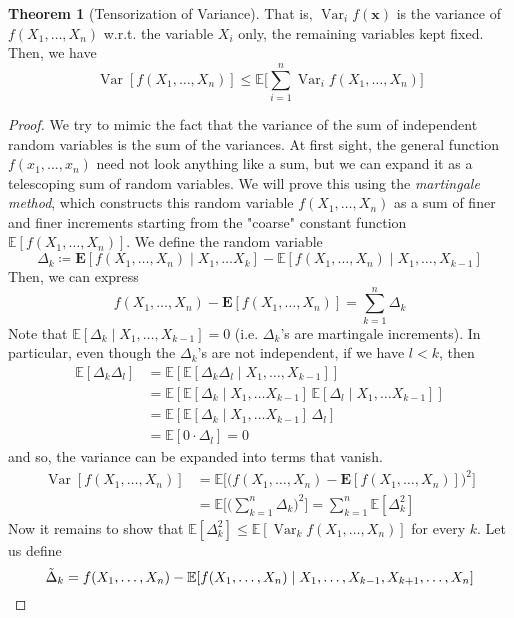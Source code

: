\documentclass{article}
\DeclareMathOperator{\Var}{Var}
\theoremstyle{definition}
\newtheorem{theorem}{Theorem}[section]
\theoremstyle{remark}
\theoremstyle{definition}
\begin{document}
\begin{theorem}[Tensorization of Variance]
That is, $\Var_i f(\mathbf{x})$ is the variance of $f(X_1, \ldots, X_n)$ w.r.t. the variable $X_i$ only, the remaining variables kept fixed. Then, we have 
\[\Var[f(X_1, \ldots, X_n)] \leq \mathbb{E} \bigg[ \sum_{i=1}^n \Var_i f(X_1, \ldots, X_n) \bigg] \]
\end{theorem}
\begin{proof}
We try to mimic the fact that the variance of the sum of independent random variables is the sum of the variances. At first sight, the general function $f(x_1, \ldots, x_n)$ need not look anything like a sum, but we can expand it as a telescoping sum of random variables. We will prove this using the \textit{martingale method}, which constructs this random variable $f(X_1, \ldots, X_n)$ as a sum of finer and finer increments starting from the "coarse" constant function $\mathbb{E}[f(X_1, \ldots, X_n)]$. We define the random variable 
\[\Delta_k \coloneqq \mathbf{E}[ f(X_1, \ldots, X_n) \mid X_1, \ldots X_k] - \mathbb{E}[ f(X_1, \ldots, X_n) \mid X_1, \ldots, X_{k-1}]\]
Then, we can express 
\[f( X_1, \ldots, X_n) - \mathbf{E}[ f(X_1, \ldots, X_n)] = \sum_{k=1}^n \Delta_k\]
Note that $\mathbb{E}[\Delta_k \mid X_1, \ldots, X_{k-1}] = 0$ (i.e. $\Delta_k$'s are martingale increments). In particular, even though the $\Delta_k$'s are not independent, if we have $l < k$, then 
\begin{align*}
    \mathbb{E}[ \Delta_k \Delta_l] & = \mathbb{E}[ \mathbb{E}[\Delta_k \Delta_l \mid X_1, \ldots, X_{k-1}]] \\
    & = \mathbb{E}[ \mathbb{E}[\Delta_k \mid X_1, \ldots X_{k-1} ] \, \mathbb{E}[\Delta_l \mid X_1, \ldots X_{k-1} ]] \\
    & = \mathbb{E}[ \mathbb{E}[\Delta_k \mid X_1, \ldots X_{k-1} ] \, \Delta_l] \\
    & = \mathbb{E}[0 \cdot \Delta_l] = 0
\end{align*}
and so, the variance can be expanded into terms that vanish. 
\begin{align*}
    \Var[ f(X_1, \ldots, X_n)] & = \mathbb{E} \big[ \big( f( X_1, \ldots, X_n) - \mathbf{E}[ f(X_1, \ldots, X_n)] \big)^2\big] \\
    & = \mathbb{E} \bigg[ \bigg( \sum_{k=1}^n \Delta_k \bigg)^2 \bigg] = \sum_{k=1}^n \mathbb{E}[ \Delta_k^2]
\end{align*}
Now it remains to show that $\mathbb{E}[\Delta_k^2] \leq \mathbb{E}[\Var_k f(X_1, \ldots, X_n)]$ for every $k$. Let us define 
\[\Tilde{\Delta}_k = f(X_1, \ldots, X_n) - \mathbb{E}[f(X_1, \ldots, X_n) \mid X_1, \ldots, X_{k-1}, X_{k+1}, \ldots, X_n]\]

\end{proof}
\end{document}
